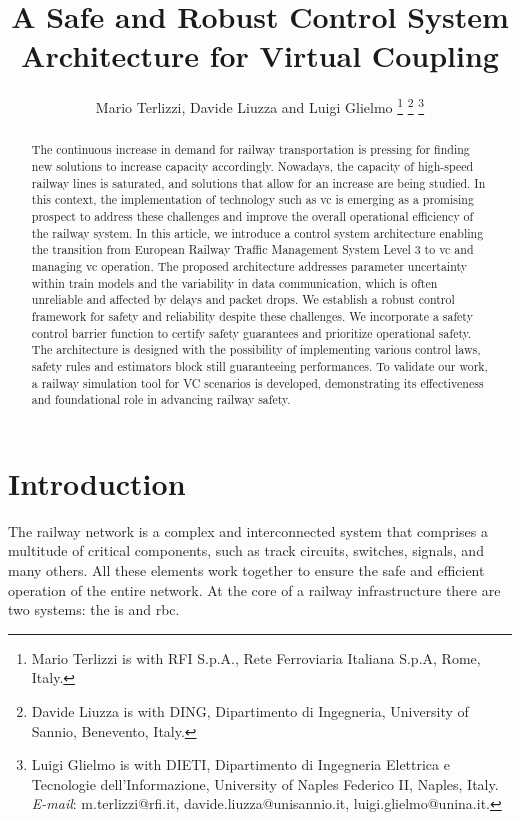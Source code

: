 \documentclass[letterpaper, 10 pt, conference]{ieeeconf}
\title{\LARGE \bf \centering
A Safe and Robust Control System Architecture for Virtual Coupling 
}
\author{Mario Terlizzi, Davide Liuzza and Luigi Glielmo%
\thanks{Mario Terlizzi is with RFI S.p.A., Rete Ferroviaria Italiana S.p.A, 
Rome, Italy.}
\thanks{Davide Liuzza is with DING, Dipartimento di Ingegneria, University of Sannio, Benevento, Italy.}
\thanks{Luigi Glielmo is with DIETI, Dipartimento di Ingegneria Elettrica e Tecnologie dell'Informazione, University of Naples Federico II, Naples, Italy.
{\textit{E-mail}:} m.terlizzi@rfi.it, davide.liuzza@unisannio.it, luigi.glielmo@unina.it. }}%
\theoremstyle{definition}
\theoremstyle{nopoint}
\begin{document}
\maketitle
\thispagestyle{empty}
\pagestyle{empty}
\begin{abstract}
The continuous increase in demand for railway transportation is pressing for finding new solutions to increase capacity accordingly. Nowadays, the capacity of high-speed railway lines is saturated, and solutions that allow for an increase are being studied. In this context, the implementation of technology such as \gls{vc} is emerging as a promising prospect to address these challenges and improve the overall operational efficiency of the railway system. In this article, we introduce a control system architecture enabling the transition from European Railway Traffic Management System Level 3 to \gls{vc} and managing \gls{vc} operation. The proposed architecture addresses parameter uncertainty within train models and the variability in data communication, which is often unreliable and affected by delays and packet drops. We establish a robust control framework for safety and reliability despite these challenges. We incorporate a safety control barrier function to certify safety guarantees and prioritize operational safety. The architecture is designed with the possibility of implementing various control laws, safety rules and estimators block still guaranteeing performances. To validate our work, a railway simulation tool for VC scenarios is developed, demonstrating its effectiveness and foundational role in advancing railway safety.
\end{abstract}



\section{Introduction}
%


The railway network is a complex and interconnected system that comprises a multitude of critical components, such as track circuits, switches, signals, and many others. All these elements work together to ensure the safe and efficient operation of the entire network. At the core of a railway infrastructure there are two systems: the \gls{is} and \gls{rbc}.
\end{document}
